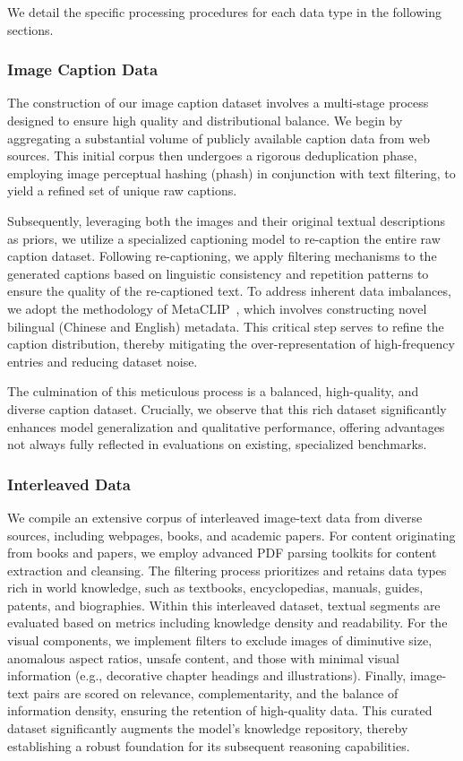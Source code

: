 We detail the specific processing procedures for each data type in the following sections.


\subsubsection{Image Caption Data} 
The construction of our image caption dataset involves a multi-stage process designed to ensure high quality and distributional balance. We begin by aggregating a substantial volume of publicly available caption data from web sources. This initial corpus then undergoes a rigorous deduplication phase, employing image perceptual hashing (phash) in conjunction with text filtering, to yield a refined set of unique raw captions.

Subsequently, leveraging both the images and their original textual descriptions as priors, we utilize a specialized captioning model to re-caption the entire raw caption dataset. Following re-captioning, we apply filtering mechanisms to the generated captions based on linguistic consistency and repetition patterns to ensure the quality of the re-captioned text. To address inherent data imbalances, we adopt the methodology of MetaCLIP~\citep{MetaCLIP}, which involves constructing novel bilingual (Chinese and English) metadata. This critical step serves to refine the caption distribution, thereby mitigating the over-representation of high-frequency entries and reducing dataset noise.

The culmination of this meticulous process is a balanced, high-quality, and diverse caption dataset. Crucially, we observe that this rich dataset significantly enhances model generalization and qualitative performance, offering advantages not always fully reflected in evaluations on existing, specialized benchmarks.

\subsubsection{Interleaved Data}
We compile an extensive corpus of interleaved image-text data from diverse sources, including webpages, books, and academic papers. For content originating from books and papers, we employ advanced PDF parsing toolkits for content extraction and cleansing. The filtering process prioritizes and retains data types rich in world knowledge, such as textbooks, encyclopedias, manuals, guides, patents, and biographies. Within this interleaved dataset, textual segments are evaluated based on metrics including knowledge density and readability. For the visual components, we implement filters to exclude images of diminutive size, anomalous aspect ratios, unsafe content, and those with minimal visual information (e.g., decorative chapter headings and illustrations). Finally, image-text pairs are scored on relevance, complementarity, and the balance of information density, ensuring the retention of high-quality data. This curated dataset significantly augments the model's knowledge repository, thereby establishing a robust foundation for its subsequent reasoning capabilities.

